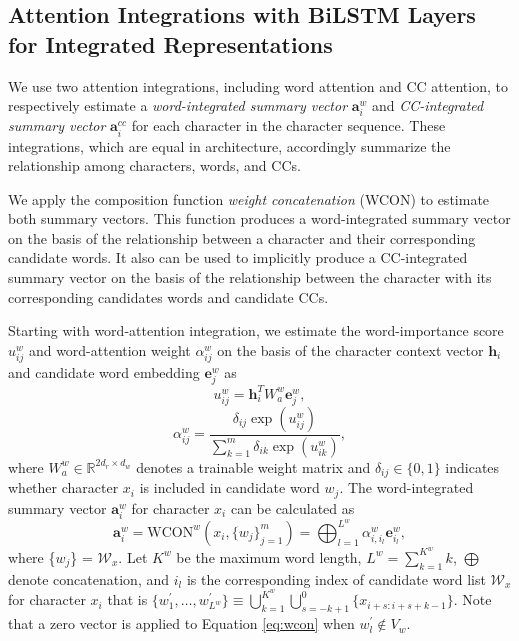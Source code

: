 \subsection{Attention Integrations with BiLSTM Layers for Integrated Representations}\label{section:attn-integration}
We use two attention integrations, including word attention and CC attention, to respectively estimate a \textit{word-integrated summary vector} $\textbf{a}_{i}^{w}$ and \textit{CC-integrated summary vector} $\textbf{a}_{i}^{cc}$ for each character in the character sequence.
%
These integrations, which are equal in architecture, accordingly summarize the relationship among characters, words, and CCs.
%

We apply the composition function \textit{weight concatenation} (WCON) \cite{higashiyama-etal-2019-incorporating,higashiyama-2022-wordseg} to estimate both summary vectors. 
This function produces a word-integrated summary vector on the basis of the relationship between a character and their corresponding candidate words.
%
It also can be used to implicitly produce a CC-integrated summary vector on the basis of the relationship between the character with its corresponding candidates words and candidate CCs.

Starting with word-attention integration, we estimate the word-importance score $u_{ij}^{w}$ and word-attention weight $\alpha_{ij}^{w}$ on the basis of the character context vector $\textbf{h}_{i}$ and candidate word embedding $\textbf{e}_{j}^{w}$ as
\begin{equation}
    u_{ij}^{w} = \textbf{h}_i^{T}W_{a}^{w}\textbf{e}_{j}^{w},
    \label{eq:word-important}
\end{equation}
%
\begin{equation}
    \alpha_{ij}^{w} = \frac{\delta_{ij}\exp(u_{ij}^{w})}{\sum_{k=1}^{m}\delta_{ik}\exp(u_{ik}^{w})},
    \label{eq:word-attn-weight}
\end{equation}
%
where $W_{a}^{w} \in \mathbb{R}^{2d_{r} \times d_{w}}$ denotes a trainable weight matrix and $\delta_{ij} \in \{0,1\}$ indicates whether character $x_{i}$ is included in candidate word $w_{j}$.
%
The word-integrated summary vector $\textbf{a}_{i}^{w}$ for character $x_{i}$ can be calculated as
%
\begin{equation}
    \textbf{a}_{i}^{w} = \text{WCON}^{w}(x_{i}, \{w_{j}\}_{j=1}^{m}) {=} \bigoplus_{l=1}^{L^{w}}\alpha_{i,i_{l}}^{w}\textbf{e}_{i_{l}}^{w},
    \label{eq:wcon}
\end{equation}
%
where \{$w_{j}$\} = $\mathcal{W}_{x}$. 
%
Let $K^{w}$ be the maximum word length, $L^{w} = \sum_{k=1}^{K^{w }}k$, $\bigoplus$ denote concatenation, and $i_{l}$ is the corresponding index of candidate word list $\mathcal{W}_{x}$ for character $x_{i}$ that is $\{w^{\prime}_{1},\dots,w^{\prime}_{L^{w}}\} \equiv \bigcup_{k=1}^{K^{w}}\bigcup_{s=-k+1}^{0}\{x_{i+s:i+s+k-1}\}$.
%
Note that a zero vector is applied to Equation \ref{eq:wcon} when $w^{\prime}_{l} \notin V_{w}$.
%


